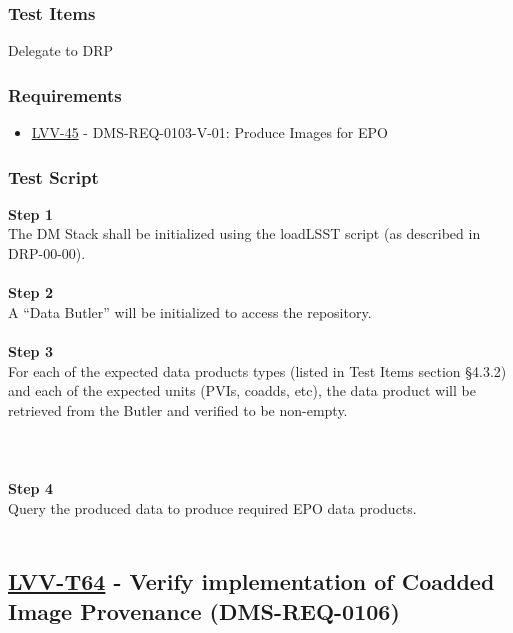 \hypertarget{test-items-152}{%
\subsubsection{Test Items}\label{test-items-152}}

Delegate to DRP

\hypertarget{requirements-153}{%
\subsubsection{Requirements}\label{requirements-153}}

\begin{itemize}
\tightlist
\item
  \href{https://jira.lsstcorp.org/browse/LVV-45}{LVV-45} -
  DMS-REQ-0103-V-01: Produce Images for EPO
\end{itemize}

\hypertarget{test-script-153}{%
\subsubsection{Test Script}\label{test-script-153}}

\textbf{Step 1}\\
The DM Stack shall be initialized using the loadLSST script (as
described in DRP-00-00).\\
~\\
\textbf{Step 2}\\
A ``Data Butler'' will be initialized to access the repository.\\
~\\
\textbf{Step 3}\\
For each of the expected data products types (listed in Test Items
section §4.3.2) and each of the expected units (PVIs, coadds, etc), the
data product will be retrieved from the Butler and verified to be
non-empty.\\
~\\
~\\
~\\
\textbf{Step 4}\\
Query the produced data to produce required EPO data products.\\
~\\

\hypertarget{lvv-t64---verify-implementation-of-coadded-image-provenance-dms-req-0106}{%
\subsection{\texorpdfstring{\href{https://jira.lsstcorp.org/secure/Tests.jspa\#/testCase/LVV-T64}{LVV-T64}
- Verify implementation of Coadded Image Provenance
(DMS-REQ-0106)}{LVV-T64 - Verify implementation of Coadded Image Provenance (DMS-REQ-0106)}}\label{lvv-t64---verify-implementation-of-coadded-image-provenance-dms-req-0106}}

